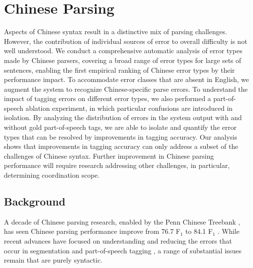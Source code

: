 \section{Chinese Parsing}

Aspects of Chinese syntax result in a distinctive mix of parsing challenges.
However, the contribution of individual sources of error to overall difficulty is not well understood.  
We conduct a comprehensive automatic analysis of error types made by Chinese parsers, covering a broad range of error types for large sets of sentences, enabling the first empirical ranking of Chinese error types by their performance impact.  
To accommodate error classes that are absent in English, we augment the system to recognize Chinese-specific parse errors.
To understand the impact of tagging errors on different error types, we also performed a part-of-speech ablation experiment, in which particular confusions are introduced in isolation.
By analyzing the distribution of errors in the system output with and without gold part-of-speech tags, we are able to isolate and quantify the error types that can be resolved by improvements in tagging accuracy.
Our analysis shows that improvements in tagging accuracy can only address a subset of the challenges of Chinese syntax.
Further improvement in Chinese parsing performance will require research addressing other challenges, in particular, determining coordination scope.

\subsection{Background}

A decade of Chinese parsing research, enabled by the Penn Chinese Treebank \parencite[\pctb;][]{Xue:2005:NLE}, has seen Chinese parsing performance improve from 76.7 F$_1$ \parencite{Bikel-Chiang:2000:CLP} to 84.1 F$_1$ \parencite{Qian-Liu:2012:EMNLP}.
While recent advances have focused on understanding and reducing the errors that occur in segmentation and part-of-speech tagging \parencite{Qian-Liu:2012:EMNLP,Jiang-etal:2009:ACL,Forst-Fang:2009:EACL}, a range of substantial issues remain that are purely syntactic.

